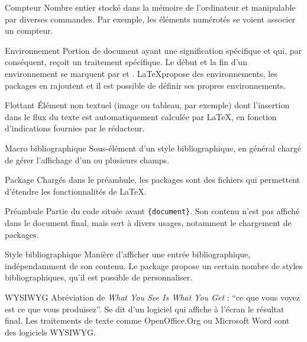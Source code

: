 \begin{glossaire}
\item[Compteur] Nombre entier stocké dans la mémoire de l'ordinateur et manipulable par diverses commandes. Par exemple, les éléments numérotés se voient associer un compteur.


\item[Environnement] Portion de document ayant une signification spécifique et qui, par conséquent, reçoit un traitement spécifique. Le début et la fin d'un environnement se marquent par  et . \LaTeX propose des environnements, les packages en rajoutent et il est possible de définir ses propres environnements.

\item[Flottant] Élément non textuel (image ou tableau, par exemple) dont l'insertion dans le flux du texte est automatiquement calculée par \LaTeX, en fonction d'indications fournies par le rédacteur.

\item[Macro bibliographique] Sous-élément d'un style bibliographique, en général chargé de gérer l'affichage d'un ou plusieurs champs.

\item[Package] Chargés dans le préambule, les packages sont des fichiers qui permettent d'étendre les fonctionnalités  de \LaTeX.

\item[Préambule] Partie du code  située avant \verb|{document}|. Son contenu n'est pas affiché dans le document final, mais sert à divers usages, notamment le chargement de packages.

\item[Style bibliographique] Manière d'afficher une entrée bibliographique, indépendamment de son contenu. Le package  propose un certain nombre de styles bibliographiques, qu'il est possible de personnaliser. 

\item[WYSIWYG] Abréviation de \textenglish{\emph{What You See Is What You Get}} : \enquote{ce que vous voyez est ce que vous produisez}. Se dit d'un logiciel qui affiche à l'écran le résultat final. Les traitements de texte comme OpenOffice.Org ou Microsoft Word sont des logiciels WYSIWYG.
\end{glossaire}
